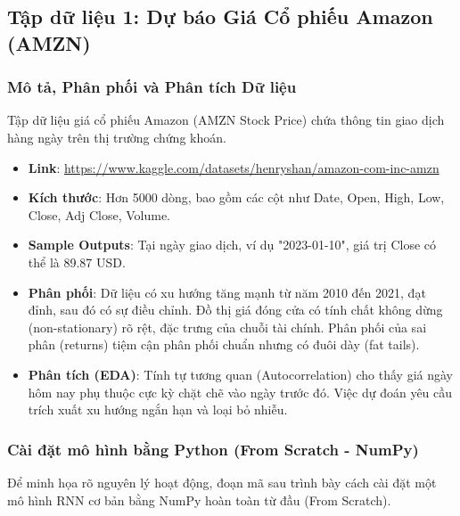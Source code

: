 \documentclass[12pt,a4paper]{article}
\begin{document}
\subsection{Tập dữ liệu 1: Dự báo Giá Cổ phiếu Amazon (AMZN)}

\subsubsection{Mô tả, Phân phối và Phân tích Dữ liệu}
Tập dữ liệu giá cổ phiếu Amazon (AMZN Stock Price) chứa thông tin giao dịch hàng ngày trên thị trường chứng khoán. 
\begin{itemize}
    \item \textbf{Link}: \url{https://www.kaggle.com/datasets/henryshan/amazon-com-inc-amzn}
    \item \textbf{Kích thước}: Hơn 5000 dòng, bao gồm các cột như Date, Open, High, Low, Close, Adj Close, Volume.
    \item \textbf{Sample Outputs}: Tại ngày giao dịch, ví dụ "2023-01-10", giá trị Close có thể là 89.87 USD.
    \item \textbf{Phân phối}: Dữ liệu có xu hướng tăng mạnh từ năm 2010 đến 2021, đạt đỉnh, sau đó có sự điều chỉnh. Đồ thị giá đóng cửa có tính chất không dừng (non-stationary) rõ rệt, đặc trưng của chuỗi tài chính. Phân phối của sai phân (returns) tiệm cận phân phối chuẩn nhưng có đuôi dày (fat tails).
    \item \textbf{Phân tích (EDA)}: Tính tự tương quan (Autocorrelation) cho thấy giá ngày hôm nay phụ thuộc cực kỳ chặt chẽ vào ngày trước đó. Việc dự đoán yêu cầu trích xuất xu hướng ngắn hạn và loại bỏ nhiễu.
\end{itemize}

\subsubsection{Cài đặt mô hình bằng Python (From Scratch - NumPy)}
Để minh họa rõ nguyên lý hoạt động, đoạn mã sau trình bày cách cài đặt một mô hình RNN cơ bản bằng NumPy hoàn toàn từ đầu (From Scratch).
\end{document}
